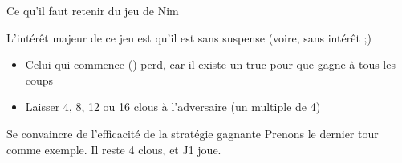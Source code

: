 \documentclass[final,hyperref={pdfpagelabels=false}]{beamer}
\renewenvironment{Coupe}{   }{   }
\renewcommand*{\normalsize}{\fontsize{\resultnormalsizeX}{\resultnormalsizeY}\selectfont}
\begin{document}
\begin{Coupe}

\begin{frame}{Ce qu'il faut retenir du jeu de Nim}

  \begin{block}{L'intérêt majeur de ce jeu est qu'il est sans suspense 
      {\color{black}\normalsize(voire, sans intérêt ;)}}
    \begin{itemize}
    \item Celui qui commence () perd, car il existe un truc pour
      que  gagne à tous les coups
    \item {} Laisser 4, 8, 12 ou 16 clous à
      l'adversaire (un multiple de 4)
    \end{itemize}
  \end{block}

  \begin{block}{Se convaincre de l'efficacité de la stratégie gagnante}
    Prenons le dernier tour comme exemple. Il reste 4 clous, et J1 joue.


\end{block}
\end{frame}
\end{Coupe}
\end{document}
